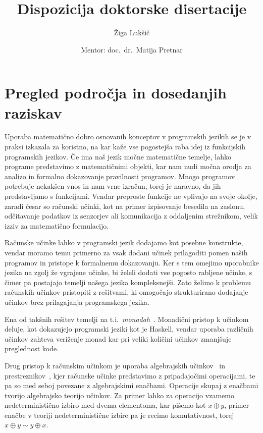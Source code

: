 \documentclass{article}
\title{Dispozicija doktorske disertacije}
\author{Žiga Lukšič \and Mentor: doc.\ dr.\ Matija Pretnar}
\date{}
\newcommand{\todo}[1]{{\color{red}{#1}}}
\begin{document}
\maketitle

\vspace{-10mm}
\begin{center}
  \Large{\textsc{\textbf{\todo{???}}}}

  \Large{\textsc{\textbf{\todo{??? but in english}}}}
\end{center}

\section*{Pregled področja in dosedanjih raziskav}

Uporaba matematično dobro osnovanih konceptov v programskih jezikih se je v praksi izkazala za koristno, na kar kaže vse pogostejša raba idej iz funkcijskih programskih jezikov. Če ima naš jezik močne matematične temelje, lahko programe predstavimo z matematičnimi objekti, kar nam nudi močna orodja za analizo in formalno dokazovanje pravilnosti programov. Mnogo programov potrebuje nekakšen vnos in nam vrne izračun, torej je naravno, da jih predstavljamo s funkcijami. Vendar preproste funkcije ne vplivajo na svoje okolje, zaradi česar so računski učinki, kot na primer izpisovanje besedila na zaslonu, odčitavanje podatkov iz senzorjev ali komunikacija z oddaljenim strežnikom, velik izziv za matematično formulacijo.

Računske učinke lahko v programski jezik dodajamo kot posebne konstrukte, vendar moramo temu primerno za vsak dodani učinek prilagoditi pomen naših programov in pristope k formalnemu dokazovanju. Ker s tem omejimo uporabnike jezika na zgolj že vgrajene učinke, bi želeli dodati vse pogosto rabljene učinke, s čimer pa postajajo temelji našega jezika kompleksnejši. Zato želimo k problemu računskih učinkov pristopiti z rešitvami, ki omogočajo strukturirano dodajanje učinkov brez prilagajanja programskega jezika.

Ena od takšnih rešitev temelji na t.i.\ \emph{monadah}~\cite{DBLP:journals/iandc/Moggi91}. Monadični pristop k učinkom deluje, kot dokazujejo programski jeziki kot je Haskell, vendar uporaba različnih učinkov zahteva veriženje monad kar pri veliki količini učinkov zmanj\-šuje preglednost kode.

Drug pristop k računskim učinkom je uporaba algebrajskih učinkov~\cite{DBLP:conf/fossacs/PlotkinP01, DBLP:journals/acs/PlotkinP03} in prestreznikov~\cite{DBLP:conf/esop/PlotkinP09}, kjer računske učinke predstavimo z pripadajočimi operacijami, te pa so med seboj povezane z algebrajskimi enačbami. Operacije skupaj z enačbami tvorijo algebrajsko teorijo učinkov. Za primer lahko za operacijo vzamemo nedeterministično izbiro med dvema elementoma, kar pišemo kot $x \oplus y$, primer enačbe v teoriji nedeterministične izbire pa je recimo komutativnost, torej $x \oplus y \sim y \oplus x$.
\end{document}
